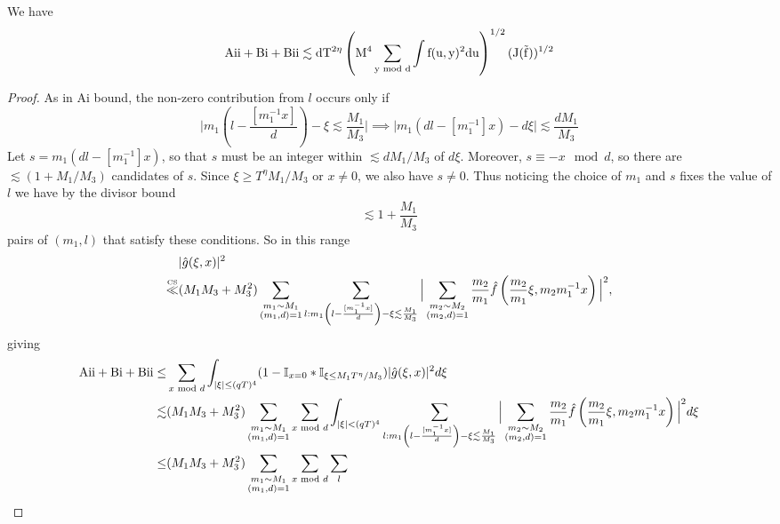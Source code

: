 \begin{lemma}\label{affineweirdterm}
    We have
    \[
    \rm{Aii}+\rm{Bi}+\rm{Bii}\lesssim dT^{2\eta}\left(M^4 \sum_{y\mod d}\int f(u,y)^2 du\right)^{1/2} (J(\tilde{f}))^{1/2}
    \]
\end{lemma}
\begin{proof}
    As in Ai bound, the non-zero contribution from $l$ occurs only if \[
        \Bigg|m_1\left(l-\frac{[m_1^{-1}x]}{d}\right)- \xi \lesssim \frac{M_1}{M_3} \Bigg|\implies
        \Bigg|m_1\left(dl-[m_1^{-1}]x\right) -d\xi\Bigg|\lesssim\frac{dM_1}{M_3}
    \]
    Let $s=m_1\left(dl-[m_1^{-1}]x\right) $, so that $s$ must be an integer within $\lesssim{dM_1}/{M_3}$ of $d\xi$. Moreover, $s\equiv -x \mod d$, so there are $\lesssim (1+M_1/M_3)$ candidates of $s$. Since $\xi\geq T^\eta M_1/M_3$ or $x\neq 0$, we also have $s\neq 0$. Thus noticing the choice of $m_1$ and $s$ fixes the value of $l$ we have by the divisor bound \[
    \lesssim 1+\frac{M_1}{M_3}
    \]
    pairs of $(m_1,l)$ that satisfy these conditions. So in this range 
    \begin{align*}
        &|\hat{g}(\xi,x)|^2 \\
        \stackon{CS}{\ll}&(M_1M_3+M_3^2)
        \sum_{\substack{m_1\sim M_1\\(m_1,d)=1}}  \sum_{l : m_1\left(l-\frac{[m_1^{-1}x]}{d}\right)- \xi \lesssim \frac{M_1}{M_3} } 
        \Big|
            \sum_{\substack{m_2\sim M_2\\(m_2,d)=1}} \frac{m_2}{m_1}\hat{f}\left(\frac{m_2}{m_1}\xi, m_2m_1^{-1}x\right) 
            \Big|^2,\\
    \end{align*}
    giving 
    \begin{align*}
        \rm{Aii}+{Bi}+{Bii}\leq&\sum_{x \mod d}\int_{|\xi|\leq (qT)^4} (1-\mathbb{I}_{x=0}*\mathbb{I}_{\xi\leq M_1T^{\eta}/M_3})|\hat{g}(\xi,x)|^2 d\xi\\
        {\lesssim}&(M_1M_3+M_3^2)
        \sum_{\substack{m_1\sim M_1\\(m_1,d)=1}} \sum_{x \mod d} \int_{|\xi|<(qT)^4}\sum_{l : m_1\left(l-\frac{[m_1^{-1}x]}{d}\right)- \xi \lesssim \frac{M_1}{M_3} } 
        \Big|
            \sum_{\substack{m_2\sim M_2\\(m_2,d)=1}} \frac{m_2}{m_1}\hat{f}\left(\frac{m_2}{m_1}\xi, m_2m_1^{-1}x\right) 
            \Big|^2d\xi\\
            \leq&(M_1M_3+M_3^2)
            \sum_{\substack{m_1\sim M_1\\(m_1,d)=1}} \sum_{x \mod d} \sum_{l} 

\end{align*}
\end{proof}
